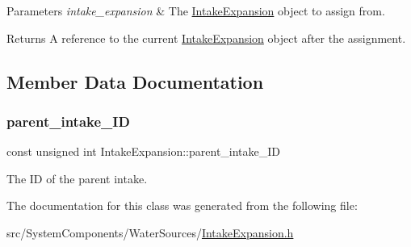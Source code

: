 \begin{DoxyParams}{Parameters}
{\em intake\+\_\+expansion} & The {\ttfamily \mbox{\hyperlink{classIntakeExpansion}{Intake\+Expansion}}} object to assign from.\\
\hline
\end{DoxyParams}
\begin{DoxyReturn}{Returns}
A reference to the current {\ttfamily \mbox{\hyperlink{classIntakeExpansion}{Intake\+Expansion}}} object after the assignment. 
\end{DoxyReturn}


\subsection{Member Data Documentation}
\mbox{\label{classIntakeExpansion_a93569405968a66226046e730e691615c}} 
\subsubsection{\texorpdfstring{parent\+\_\+intake\+\_\+\+ID}{parent\_intake\_ID}}
{\footnotesize\ttfamily const unsigned int Intake\+Expansion\+::parent\+\_\+intake\+\_\+\+ID}



The ID of the parent intake. 



The documentation for this class was generated from the following file\+:\begin{DoxyCompactItemize}
\item 
src/\+System\+Components/\+Water\+Sources/\mbox{\hyperlink{IntakeExpansion_8h}{Intake\+Expansion.\+h}}\end{DoxyCompactItemize}
